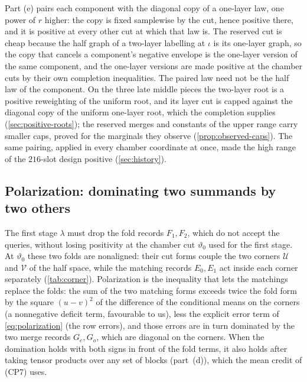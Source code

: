 \begin{remark}\label{rem:fold-pairing}
Part (e) pairs each component with the diagonal copy of a one-layer law, one
power of $r$ higher: the copy is fixed samplewise by the cut, hence positive
there, and it is positive at every other cut at which that law is. The
reserved cut is cheap because the half graph of a two-layer labelling at
$\iota$ is its one-layer graph, so the copy that cancels a component's negative
envelope is the one-layer version of the same component, and the one-layer
versions are made positive at the chamber cuts by their own completion
inequalities. The paired law need not be the half law of the component. On the
three late middle pieces the two-layer root is a positive reweighting of the
uniform root, and its layer cut is capped against the diagonal copy of the
uniform one-layer root, which the completion supplies
(\cref{sec:positive-roots}); the reserved merges and constants of the upper
range carry smaller caps, proved for the marginals they observe
(\cref{prop:observed-caps}). The same pairing, applied in every chamber
coordinate at once, made the high range of the $216$-slot design positive
(\cref{sec:history}).
\end{remark}

\subsection{Polarization: dominating two summands by two others}\label{subsec:polarization}

The first stage $\lambda$ must drop the fold records $F_1,F_2$,
which do not accept the queries, without losing positivity at the
chamber cut $\vartheta_0$ used for the first stage. At $\vartheta_0$
these two folds are nonaligned: their cut forms couple the two
corners $\mathcal U$ and $\mathcal V$ of the half space, while the
matching records $E_0,E_1$ act inside each corner separately
(\cref{tab:corner}). Polarization is the inequality that lets the
matchings replace the folds: the sum of the two matching forms
exceeds twice the fold form by the square $(u-v)^2$ of the
difference of the conditional means on the corners (a nonnegative
deficit term, favourable to us), less the explicit error term of
\eqref{eq:polarization} (the row errors), and those errors are in turn
dominated by the two merge records $G_e,G_o$, which are diagonal
on the corners. When the domination holds with both signs in
front of the fold terms, it also holds after taking tensor
products over any set of blocks (part~(d)), which the mean credit
of (CP7) uses.

